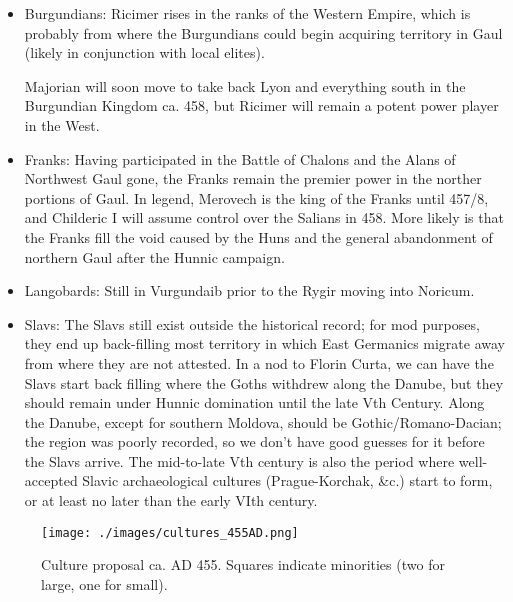 \documentclass{article}
\begin{document}
\begin{itemize}
		\item Burgundians:\newline
		Ricimer rises in the ranks of the Western Empire, which is probably from where the Burgundians could begin acquiring territory in Gaul (likely in conjunction with local elites).
		
		Majorian will soon move to take back Lyon and everything south in the Burgundian Kingdom ca. 458, but Ricimer will remain a potent power player in the West.
		
		\item Franks:\newline
		Having participated in the Battle of Chalons and the Alans of Northwest Gaul gone, the Franks remain the premier power in the norther portions of Gaul.
		In legend, Merovech is the king of the Franks until 457/8, and Childeric I will assume control over the Salians in 458.
		More likely is that the Franks fill the void caused by the Huns and the general abandonment of northern Gaul after the Hunnic campaign.
		
		\item Langobards:\newline
		Still in Vurgundaib prior to the Rygir moving into Noricum.
		
		\item Slavs:\newline
		The Slavs still exist outside the historical record; for mod purposes, they end up back-filling most territory in which East Germanics migrate away from where they are not attested.
		In a nod to Florin Curta, we can have the Slavs start back filling where the Goths withdrew along the Danube, but they should remain under Hunnic domination until the late Vth Century.
		Along the Danube, except for southern Moldova, should be Gothic/Romano-Dacian; the region was poorly recorded, so we don't have good guesses for it before the Slavs arrive.
		The mid-to-late Vth century is also the period where well-accepted Slavic archaeological cultures (Prague-Korchak, \&c.) start to form, or at least no later than the early VIth century.
	\end{itemize}
	
	\newpage
	
	\begin{figure}[h!]
		\centering
		\texttt{[image: ./images/cultures\_455AD.png]}
		\caption{Culture proposal ca. AD 455. Squares indicate minorities (two for large, one for small).}
	\end{figure}
	
\end{document}
